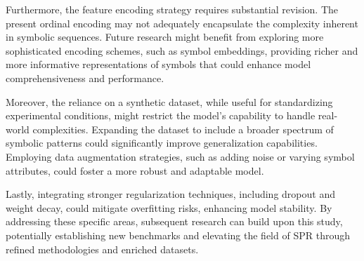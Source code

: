 \documentclass{article}
\begin{document}
Furthermore, the feature encoding strategy requires substantial revision. The present ordinal encoding may not adequately encapsulate the complexity inherent in symbolic sequences. Future research might benefit from exploring more sophisticated encoding schemes, such as symbol embeddings, providing richer and more informative representations of symbols that could enhance model comprehensiveness and performance.

Moreover, the reliance on a synthetic dataset, while useful for standardizing experimental conditions, might restrict the model’s capability to handle real-world complexities. Expanding the dataset to include a broader spectrum of symbolic patterns could significantly improve generalization capabilities. Employing data augmentation strategies, such as adding noise or varying symbol attributes, could foster a more robust and adaptable model.

Lastly, integrating stronger regularization techniques, including dropout and weight decay, could mitigate overfitting risks, enhancing model stability. By addressing these specific areas, subsequent research can build upon this study, potentially establishing new benchmarks and elevating the field of SPR through refined methodologies and enriched datasets.



\end{document}

